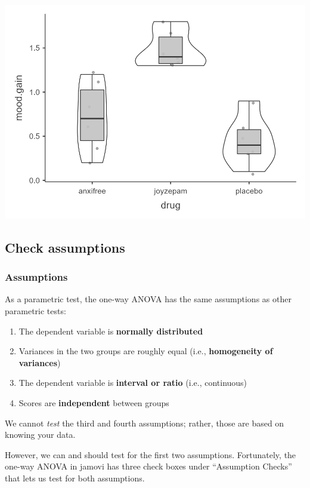 \documentclass[
]{book}
\begin{document}
\includegraphics{images/04_one-way-anova/anova_graph.png}

\hypertarget{anova-assumptions}{%
\subsection{Check assumptions}\label{anova-assumptions}}

\hypertarget{assumptions-3}{%
\subsubsection{Assumptions}\label{assumptions-3}}

As a parametric test, the one-way ANOVA has the same assumptions as other parametric tests:

\begin{enumerate}
\def\labelenumi{\arabic{enumi}.}
\item
  The dependent variable is \textbf{normally distributed}
\item
  Variances in the two groups are roughly equal (i.e., \textbf{homogeneity of variances})
\item
  The dependent variable is \textbf{interval or ratio} (i.e., continuous)
\item
  Scores are \textbf{independent} between groups
\end{enumerate}

We cannot \emph{test} the third and fourth assumptions; rather, those are based on knowing your data.

However, we can and should test for the first two assumptions. Fortunately, the one-way ANOVA in jamovi has three check boxes under ``Assumption Checks'' that lets us test for both assumptions.
\end{document}

